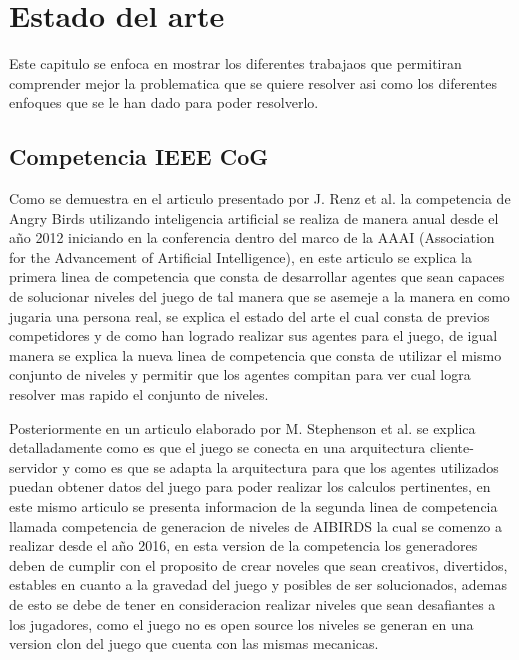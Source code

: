 \chapter{Estado del arte}
\label{chapter:related-work}

Este capitulo se enfoca en mostrar los diferentes trabajaos que permitiran
comprender mejor la problematica que se quiere resolver asi como los diferentes
enfoques que se le han dado para poder resolverlo.

\section{Competencia IEEE CoG}
\label{section:ieeecog}

Como se demuestra en el articulo presentado por J. Renz et al.\cite{Renz2016} la
competencia de Angry Birds utilizando inteligencia artificial se realiza de
manera anual desde el año 2012 iniciando en la conferencia dentro del marco de
la AAAI (Association for the Advancement of Artificial Intelligence), en este
articulo se explica la primera linea de competencia que consta de desarrollar
agentes que sean capaces de solucionar niveles del juego de tal manera que se
asemeje a la manera en como jugaria una persona real, se explica el estado del
arte el cual consta de previos competidores y de como han logrado realizar sus
agentes para el juego, de igual manera se explica la nueva linea de competencia
que consta de utilizar el mismo conjunto de niveles y permitir que los agentes
compitan para ver cual logra resolver mas rapido el conjunto de niveles.

Posteriormente en un articulo elaborado por M. Stephenson et
al.\cite{Stephenson2018The2A} se explica detalladamente como es que el juego se
conecta en una arquitectura cliente-servidor y como es que se adapta la
arquitectura para que los agentes utilizados puedan obtener datos del juego para
poder realizar los calculos pertinentes, en este mismo articulo se presenta
informacion de la segunda linea de competencia llamada competencia de generacion
de niveles de AIBIRDS la cual se comenzo a realizar desde el año 2016, en esta
version de la competencia los generadores deben de cumplir con el proposito de
crear noveles que sean creativos, divertidos, estables en cuanto a la gravedad
del juego y posibles de ser solucionados, ademas de esto se debe de tener en
consideracion realizar niveles que sean desafiantes a los jugadores, como el
juego no es open source los niveles se generan en una version clon del juego que
cuenta con las mismas mecanicas.

